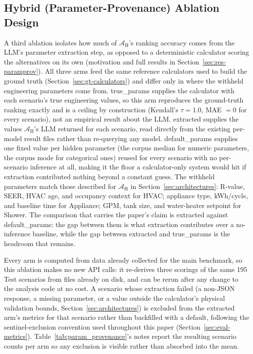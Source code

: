 \documentclass[final,3p,times]{elsarticle}
\begin{document}
\subsection{Hybrid (Parameter-Provenance) Ablation Design}
\label{sec:hybrid-ablation-methods}
A third ablation isolates how much of $\mathcal{A}_{\text{H}}$'s ranking accuracy comes from the LLM's parameter extraction step, as opposed to a deterministic calculator scoring the alternatives on its own (motivation and full results in Section~\ref{sec:res-paramprov}). All three arms feed the same reference calculators used to build the ground truth (Section~\ref{sec:gt-calculators}) and differ only in where the withheld engineering parameters come from. true\_params supplies the calculator with each scenario's true engineering values, so this arm reproduces the ground-truth ranking exactly and is a ceiling by construction (Kendall's $\tau=1.0$, MAE $=0$ for every scenario), not an empirical result about the LLM. extracted supplies the values $\mathcal{A}_{\text{H}}$'s LLM returned for each scenario, read directly from the existing per-model result files rather than re-querying any model. default\_params supplies one fixed value per hidden parameter (the corpus median for numeric parameters, the corpus mode for categorical ones) reused for every scenario with no per-scenario inference at all, making it the floor a calculator-only system would hit if extraction contributed nothing beyond a constant guess. The withheld parameters match those described for $\mathcal{A}_{\text{H}}$ in Section~\ref{sec:architectures}: R-value, SEER, HVAC age, and occupancy context for HVAC; appliance type, kWh/cycle, and baseline time for Appliance; GPM, tank size, and water-heater setpoint for Shower. The comparison that carries the paper's claim is extracted against default\_params: the gap between them is what extraction contributes over a no-inference baseline, while the gap between extracted and true\_params is the headroom that remains.

Every arm is computed from data already collected for the main benchmark, so this ablation makes no new API calls: it re-derives three scorings of the same 195 Test scenarios from files already on disk, and can be rerun after any change to the analysis code at no cost. A scenario whose extraction failed (a non-JSON response, a missing parameter, or a value outside the calculator's physical validation bounds, Section~\ref{sec:architectures}) is excluded from the extracted arm's metrics for that scenario rather than backfilled with a default, following the sentinel-exclusion convention used throughout this paper (Section~\ref{sec:eval-metrics}). Table~\ref{tab:param_provenance}'s notes report the resulting scenario counts per arm so any exclusion is visible rather than absorbed into the mean.
\end{document}
